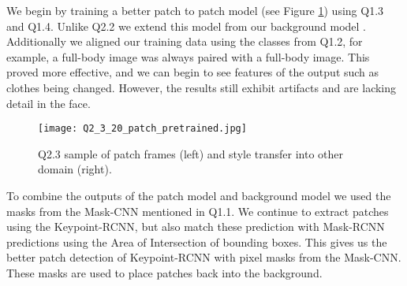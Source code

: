  We begin by training a better patch to patch model (see Figure \ref{fig:Q2_4}) using Q1.3 and Q1.4. 
Unlike Q2.2 we extend this model from our background model .
 Additionally we aligned our training data using the classes from Q1.2, for example, a full-body image was always paired with a full-body image.
 This proved more effective, and we can begin to see features of the output such as clothes being changed.
 However, the results still exhibit artifacts and are lacking detail in the face. 
 
 \begin{figure}[h!]
  \begin{center}
  \texttt{[image: Q2\_3\_20\_patch\_pretrained.jpg]}
    \caption{Q2.3 sample of patch frames (left) and style transfer into other domain (right).}
    \label{fig:Q2_4}
  \end{center}
  \end{figure}
 
 To combine the outputs of the patch model and background model we used the masks from the Mask-CNN mentioned in Q1.1.
 We continue to extract patches using the Keypoint-RCNN, but also match these prediction with Mask-RCNN predictions using the Area of Intersection of bounding boxes.
 This gives us the better patch detection of Keypoint-RCNN with pixel masks from the Mask-CNN.
 These masks are used to place patches back into the background.
 